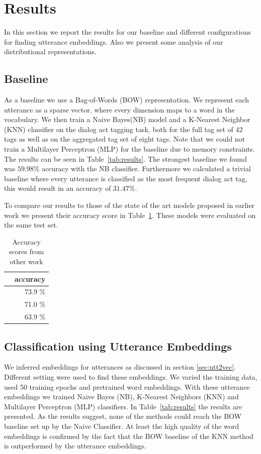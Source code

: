 \section{Results}\label{sec:results}
In this section we report the results for our baseline and different configurations for finding utterance embeddings.
Also we present some analysis of our distributional representations.

\subsection{Baseline}
As a baseline we use a Bag-of-Words (BOW) representation.
We represent each utterance as a sparse vector, where every dimension maps to a word in the vocabulary.
We then train a Naive Bayes(NB) model and a K-Nearest Neighbor (KNN) classifier on the dialog act tagging task, both for the full tag set of 42 tags as well as on the aggregated tag set of eight tags.
Note that we could not train a Multilayer Perceptron (MLP) for the baseline due to memory constraints.
The results can be seen in Table~\ref{tab:results}. The strongest baseline we found was $59.98\%$ accuracy with the NB classifier.
Furthermore we calculated a trivial baseline where every utterance is classified as the most frequent dialog act tag, this would result in an accuracy of $31.47\%$.

To compare our results to those of the state of the art models proposed in earlier work we present their accuracy score in Table~\ref{tab:sota}. These models were evaluated on the same test set.
\begin{table}[t]
	\centering
	\begin{tabular}{r|r}
		& \textbf{accuracy} \\ \hline
		\newcite{kalchbrenner} & 73.9 \%           \\
		\newcite{stolcke2000}  & 71.0 \%           \\
		\newcite{milajevs}     & 63.9 \%          
	\end{tabular}
		\caption{Accuracy scores from other work}
		\label{tab:sota}
\end{table}

\subsection{Classification using Utterance Embeddings}
We inferred embeddings for utterances as discussed in section \ref{sec:utt2vec}.
Different setting were used to find these embeddings. We varied the training data, used 50 training epochs and pretrained word embeddings.
With these utterance embeddings we trained Naive Bayes (NB), K-Nearest Neighbors (KNN) and Multilayer Perceptron (MLP) classifiers.
In Table~\ref{tab:results} the results are presented.
As the results suggest, none of the methods could reach the BOW baseline set up by the Naive Classifier.
At least the high quality of the word embeddings is confirmed by the fact that the BOW baseline of the KNN method is outperformed by the utterance embeddings.

